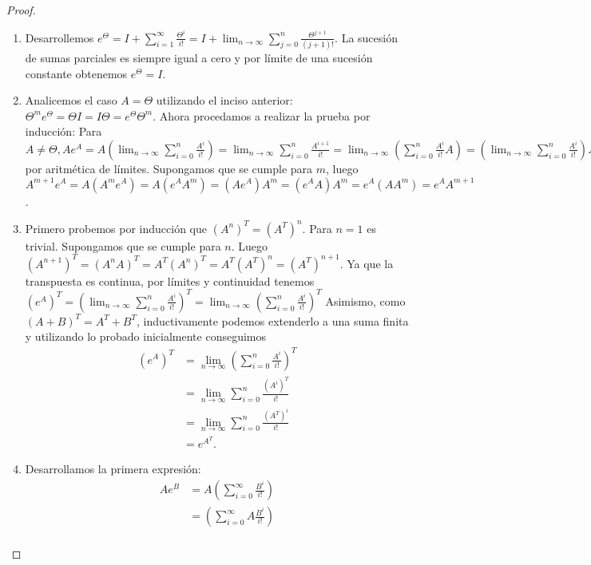 \documentclass{article}
\theoremstyle{definition}
\theoremstyle{remark}
\begin{document}
\begin{proof}
  \begin{enumerate}
    \item Desarrollemos $e^{\Theta} = I + \sum_{i = 1}^{\infty} \frac{\Theta^i}{i!}
      = I + \lim_{n \to \infty} \sum_{j = 0}^n \frac{\Theta^{j + 1}}{(j + 1)!}$.
      La sucesi\'on de sumas parciales es siempre igual a cero y por l\'imite de una
      sucesi\'on constante obtenemos $e^{\Theta} = I$.
    \item Analicemos el caso $A = \Theta$ utilizando el inciso anterior:
      $\Theta^m e^\Theta = \Theta I = I \Theta = e^{\Theta} \Theta^m$.
      Ahora procedamos a realizar la prueba por inducci\'on:
      Para $A \neq \Theta, A e^A = A (\lim_{n \to \infty} \sum_{i = 0}^n \frac{A^i}{i!}) =
      \lim_{n \to \infty} \sum_{i = 0}^n \frac{A^{i + 1}}{i!} =
      \lim_{n \to \infty} (\sum_{i = 0}^n \frac{A^i}{i!} A) =
      (\lim_{n \to \infty} \sum_{i = 0}^n \frac{A^i}{i!}) A =
      e^A A$ por aritm\'etica de l\'imites.
      Supongamos que se cumple para $m$, luego
      $A^{m + 1} e^A = A (A^m e^A) = A (e^A A^m) = (A e^A) A^m = (e^A A) A^m = e^A (A A^m) = e^A A^{m + 1}$.
    \item Primero probemos por inducci\'on que $(A^n)^T = (A^T)^n$. Para $n = 1$ es trivial.
      Supongamos que se cumple para $n$. Luego $(A^{n + 1})^T = (A^n A)^T = A^T (A^n)^T = A^T (A^T)^n = (A^T)^{n + 1}$.
      Ya que la transpuesta es continua, por l\'imites y continuidad tenemos
      $(e^A)^T = (\lim_{n \to \infty} \sum_{i = 0}^n \frac{A^i}{i!})^T = \lim_{n \to \infty} (\sum_{i = 0}^n \frac{A^i}{i!})^T$
      Asimismo, como $(A + B)^T = A^T + B^T$, inductivamente podemos extenderlo a una suma finita y utilizando lo probado inicialmente conseguimos
      \begin{align*}
        (e^A)^T &= \lim_{n \to \infty} \left(\sum_{i = 0}^n \frac{A^i}{i!}\right)^T\\
        &= \lim_{n \to \infty} \sum_{i = 0}^n \frac{(A^i)^T}{i!}\\
        &= \lim_{n \to \infty} \sum_{i = 0}^n \frac{(A^T)^i}{i!}\\
        &= e^{A^T}.
      \end{align*}
    \item Desarrollamos la primera expresi\'on:
      \begin{align*}
        A e^B &= A \left(\sum_{i = 0}^{\infty} \frac{B^i}{i!}\right)\\
        &= \left(\sum_{i = 0}^{\infty} A \frac{B^i}{i!}\right)\\

\end{align*}
\end{enumerate}
\end{proof}
\end{document}

